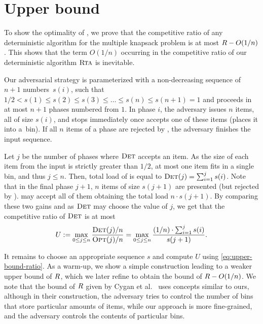 
\section{Upper bound}
\label{sec:upper}

To show the optimality of \ALG, we prove that the competitive ratio of any
deterministic algorithm for the multiple knapsack problem is at most $R -
O(1/n)$. This shows that the term $O(1/n)$ occurring in the competitive
ratio of our deterministic algorithm $\textsc{Rta}$ is inevitable.

Our adversarial strategy is parameterized with a non-decreasing sequence of $n +
1$ numbers~$s(i)$, such that $1/2 < s(1) \leq s(2) \leq s(3) \leq \ldots \leq
s(n) \leq s(n+1) = 1$ and proceeds in at most $n+1$ phases numbered from $1$. In
phase $i$, the adversary issues $n$ items, all of size $s(i)$, and stops
immediately once \DET accepts one of these items (places it into a~bin). If all
$n$ items of a phase are rejected by \DET, the adversary finishes the input
sequence. 

Let $j$ be the number of phases where $\textsc{Det}$ accepts an item. As the size of
each item from the input is strictly greater than $1/2$, at most one item fits
in a single bin, and thus $j \leq n$. Then, total load of \DET is equal to
$\textsc{Det}(j) = \sum_{i = 1}^{j} s(i)$. Note that in the final phase $j+1$, $n$ items
of size $s(j+1)$ are presented (but rejected by \DET). \OPT may accept all of
them obtaining the total load $n \cdot s(j+1)$. By comparing these two gains and
as $\textsc{Det}$ may choose the value of $j$, we get that the competitive ratio of
$\textsc{Det}$ is at most
\begin{equation}
\label{eq:upper-bound-ratio}
U := \max_{0 \leq j \leq n} \frac{\textsc{Det}(j) / n}{\textsc{Opt}(j) / n} = 
  \max_{0 \leq j \leq n} \frac{ (1/n) \cdot \sum_{i = 1}^{j} s(i)}{s(j+1)}.
\end{equation}

It remains to choose an appropriate sequence $s$ and compute $U$ using \eqref{eq:upper-bound-ratio}. 
As a warm-up, we show a simple
construction leading to a weaker upper bound of $R$, which we later refine to
obtain the bound of $R - O(1/n)$. We note that the bound of $R$ given by Cygan
et al.~\cite{CyJeSg16} uses concepts similar to ours, although in their
construction, the adversary tries to control the number of bins that store
particular amounts of items, while our approach is more fine-grained, and the
adversary controls the contents of particular bins. 

